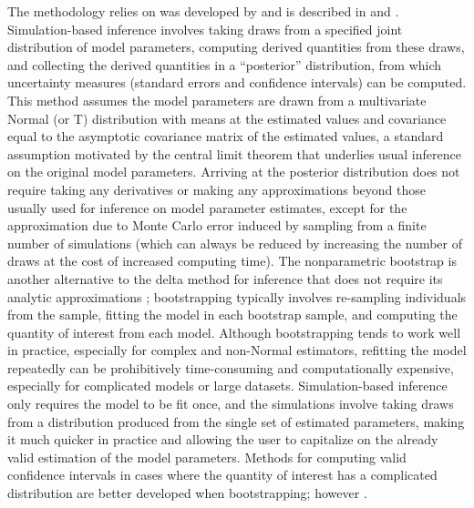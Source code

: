 The methodology  relies on was developed by \citet{krinsky1986} and is described in \citet{kingMakingMostStatistical2000} and \citet{herronPostestimationUncertaintyLimited1999}. Simulation-based inference involves taking draws from a specified joint distribution of model parameters, computing derived quantities from these draws, and collecting the derived quantities in a ``posterior'' distribution, from which uncertainty measures (standard errors and confidence intervals) can be computed. This method assumes the model parameters are drawn from a multivariate Normal (or T) distribution with means at the estimated values and covariance equal to the asymptotic covariance matrix of the estimated values, a standard assumption motivated by the central limit theorem that underlies usual inference on the original model parameters. Arriving at the posterior distribution does not require taking any derivatives or making any approximations beyond those usually used for inference on model parameter estimates, except for the approximation due to Monte Carlo error induced by sampling from a finite number of simulations (which can always be reduced by increasing the number of draws at the cost of increased computing time).
The nonparametric bootstrap is another alternative to the delta method for inference that does not require its analytic approximations \citep{efronBootstrapMethodsStandard1986}; bootstrapping typically involves re-sampling individuals from the sample, fitting the model in each bootstrap sample, and computing the quantity of interest from each model. Although bootstrapping tends to work well in practice, especially for complex and non-Normal estimators, refitting the model repeatedly can be prohibitively time-consuming and computationally expensive, especially for complicated models or large datasets. Simulation-based inference only requires the model to be fit once, and the simulations involve taking draws from a distribution produced from the single set of estimated parameters, making it much quicker in practice and allowing the user to capitalize on the already valid estimation of the model parameters. Methods for computing valid confidence intervals in cases where the quantity of interest has a complicated distribution are better developed when bootstrapping; however \citep{efronBootstrapMethodsStandard1986}.
